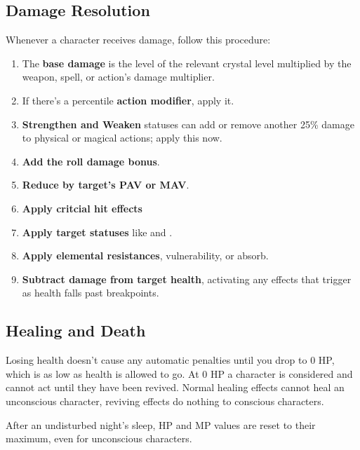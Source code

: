 \begin{multicols}{2}
    \subsection{Damage Resolution}
        Whenever a character receives damage, follow this procedure:

        \begin{enumerate}
            \item The \textbf{base damage} is the level of the relevant crystal level multiplied by the weapon, spell, or action's damage multiplier.

            \item If there's a percentile \textbf{action modifier}, apply it.

            \item \textbf{Strengthen and Weaken} statuses can add or remove another 25\% damage to physical or magical actions; apply this now.

            \item \textbf{Add the roll damage bonus}.
            \item \textbf{Reduce by target's PAV or MAV}.        
            \item \textbf{Apply critcial hit effects}
            \item \textbf{Apply target statuses} like  and .
            \item \textbf{Apply elemental resistances}, vulnerability, or absorb.
            \item \textbf{Subtract damage from target health}, activating any effects that trigger as health falls past breakpoints.
        \end{enumerate}

    \subsection{Healing and Death}\label{subsec:heal}
        
        Losing health doesn't cause any automatic penalties until you drop to 0 HP, which is as low as health is allowed to go. At 0 HP a character is considered  and cannot act until they have been revived. Normal healing effects cannot heal an unconscious character, reviving effects do nothing to conscious characters.

        After an undisturbed night's sleep, HP and MP values are reset to their maximum, even for unconscious characters.


\end{multicols}
